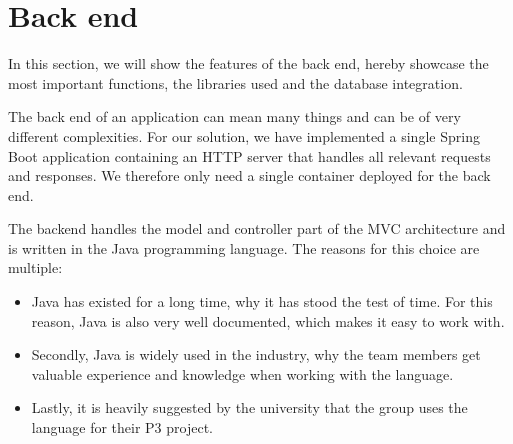 \section{Back end}\label{sec:back-end}

In this section, we will show the features of the back end, hereby showcase the most important functions,
the libraries used and the database integration.

The back end of an application can mean many things and can be of very different complexities.
For our solution, we have implemented a single Spring Boot application containing an HTTP server that handles all
relevant requests and responses.
We therefore only need a single container deployed for the back end.

The backend handles the model and controller part of the MVC architecture and is written in the Java programming
language.
The reasons for this choice are multiple:

\begin{itemize}
    \item Java has existed for a long time, why it has stood the test of time.
    For this reason, Java is also very well documented, which makes it easy to work with.
    \item Secondly, Java is widely used in the industry, why the team members get valuable experience and knowledge when
    working with the language.
    \item Lastly, it is heavily suggested by the university that the group uses the language for their P3 project.
\end{itemize}






